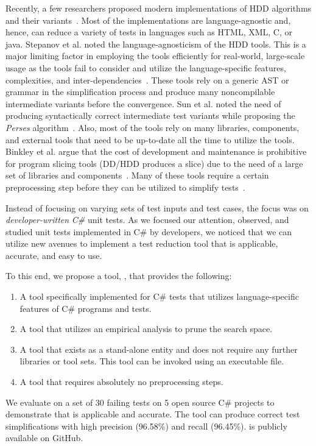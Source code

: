 Recently, a few researchers proposed modern implementations of HDD algorithms and their variants~\cite{hodovan2016modernizing, perses, gopinath2020abstracting, stepanov2019reduktor}. Most of the implementations are language-agnostic and, hence, can reduce a variety of tests in languages such as HTML, XML, C, or java. Stepanov et al. noted the language-agnosticism of the HDD tools. This is a major limiting factor in employing the tools efficiently for real-world, large-scale usage as the tools fail to consider and utilize the language-specific features, complexities, and inter-dependencies~\cite{stepanov2019reduktor}. These tools rely on a generic AST or grammar in the simplification process and produce many noncompilable intermediate variants before the convergence. Sun et al. noted the need of producing syntactically correct intermediate test variants while proposing the \emph{Perses} algorithm~\cite{perses}.  Also, most of the tools rely on many libraries, components, and external tools that need to be up-to-date all the time to utilize the tools. Binkley et al. argue that the cost of development and maintenance is prohibitive for program slicing tools (DD/HDD produces a slice) due to the need of a large set of libraries and components~\cite{binkley2014orbs}. Many of these tools require a certain preprocessing step before they can be utilized to simplify tests~\cite{perses, hodovan2016modernizing}. 

Instead of focusing on varying sets of test inputs and test cases, the focus was on \emph{developer-written} \emph{C\#} unit tests. As we focused our attention, observed, and studied unit tests implemented in C\# by developers, we noticed that we can utilize new avenues to implement a test reduction tool that is applicable, accurate, and easy to use. 

To this end, we propose a tool, \mytool, that provides the following: 

\begin{enumerate}
    \item A tool specifically implemented for C\# tests that utilizes language-specific features of C\# programs and tests. 
    \item A tool that utilizes an empirical analysis to prune the search space.
    \item A tool that exists as a stand-alone entity and does not require any further libraries or tool sets. This tool can be invoked using an executable file. 
    \item A tool that requires absolutely no preprocessing steps.
\end{enumerate}

We evaluate \mytool on a set of 30 failing tests on 5 open source C\# projects to demonstrate that \mytool is applicable and accurate. The tool can produce correct test simplifications with high precision (96.58\%) and recall (96.45\%). \mytool is publicly available on GitHub. 












